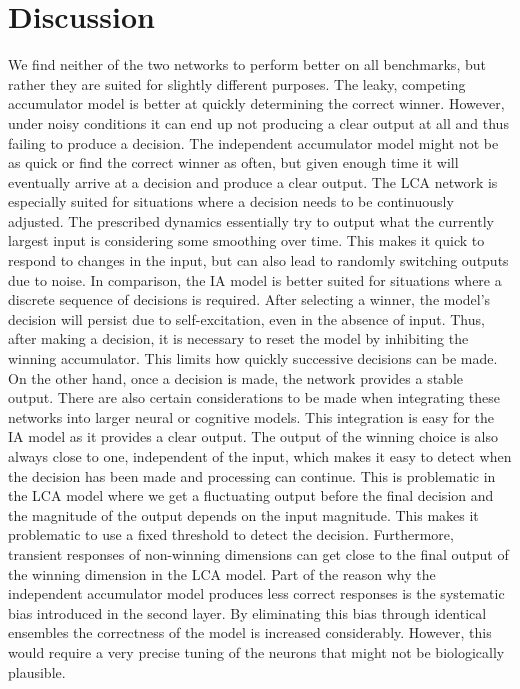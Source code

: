 \documentclass[10pt,letterpaper]{article}
\begin{document}
\section{Discussion}
We find neither of the two networks to perform better on all benchmarks, but rather they are suited for slightly different purposes.
The leaky, competing accumulator model is better at quickly determining the correct winner.
However, under noisy conditions it can end up not producing a clear output at all and thus failing to produce a decision.
The independent accumulator model might not be as quick or find the correct winner as often, but given enough time it will eventually arrive at a decision and produce a clear output.
The LCA network is especially suited for situations where a decision needs to be continuously adjusted.
The prescribed dynamics essentially try to output what the currently largest input is considering some smoothing over time.
This makes it quick to respond to changes in the input, but can also lead to randomly switching outputs due to noise.
In comparison, the IA model is better suited for situations where a discrete sequence of decisions is required.
After selecting a winner, the model's decision will persist due to self-excitation, even in the absence of input.
Thus, after making a decision, it is necessary to reset the model by inhibiting the winning accumulator.
This limits how quickly successive decisions can be made.
On the other hand, once a decision is made, the network provides a stable output.
There are also certain considerations to be made when integrating these networks into larger neural or cognitive models.
This integration is easy for the IA model as it provides a clear output.
The output of the winning choice is also always close to one, independent of the input, which makes it easy to detect when the decision has been made and processing can continue.
This is problematic in the LCA model where we get a fluctuating output before the final decision and the magnitude of the output depends on the input magnitude.
This makes it problematic to use a fixed threshold to detect the decision.
Furthermore, 
transient responses of non-winning dimensions can get close to the final output of the winning dimension in the LCA model.
Part of the reason why the independent accumulator model produces less correct responses is the systematic bias introduced in the second layer.
By eliminating this bias through identical ensembles the correctness of the model is increased considerably.
However, this would require a very precise tuning of the neurons that might not be biologically plausible.
\end{document}
